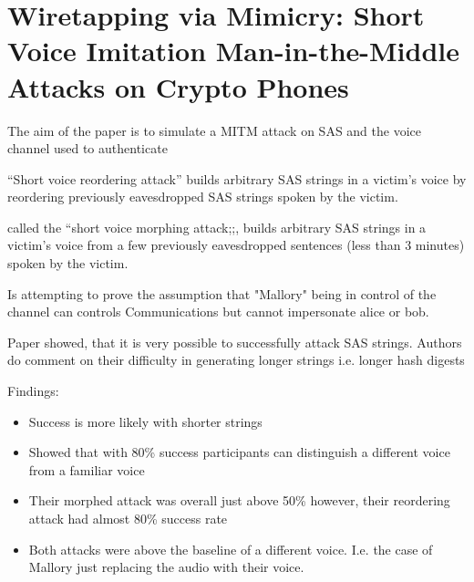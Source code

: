 \section{Wiretapping via Mimicry: Short Voice Imitation
Man-in-the-Middle Attacks on Crypto Phones}

The aim of the paper is to simulate a MITM attack on SAS and the voice channel used to authenticate

``Short voice reordering attack'' builds arbitrary SAS
strings in a victim’s voice by reordering previously eavesdropped SAS strings spoken by the victim.

called the ``short voice morphing attack;;, builds arbitrary SAS strings in a victim’s voice from a few previously eavesdropped sentences (less
than 3 minutes) spoken by the victim.

Is attempting to prove the assumption that "Mallory" being in control of the channel can controls Communications but cannot impersonate alice or bob.

Paper showed, that it is very possible to successfully attack SAS strings. Authors do comment on their difficulty in generating longer strings i.e. longer hash digests

Findings:
\begin{itemize}
    \item Success is more likely with shorter strings
    \item Showed that with 80\% success participants can distinguish a different voice from a familiar voice
    \item Their morphed attack was overall just above 50\% however, their reordering attack had almost 80\% success rate
    \item Both attacks were above the baseline of a different voice. I.e. the case of Mallory just replacing the audio with their voice.
\end{itemize}